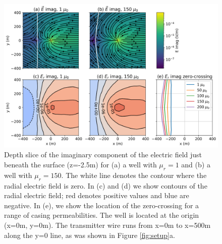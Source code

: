\begin{figure}
    \begin{center}
    \includegraphics[width=\textwidth]{figures/zero-crossing-permeability.png}
    \end{center}
\caption{
    Depth slice of the imaginary component of the electric field just beneath the surface (z=-2.5m) for (a) a well with $\mu_r=1$ and (b) a well with $\mu_r=150$. The white line denotes the contour where the radial electric field is zero. In (c) and (d) we show contours of the radial electric field; red denotes positive values and blue are negative. In (e), we show the location of the zero-crossing for a range of casing permeabilities. The well is located at the origin (x=0m, y=0m). The transmitter wire runs from x=0m to x=500m along the y=0 line, as was shown in Figure \ref{fig:setup}a.
}
\label{fig:zero-crossing-permeability}
\end{figure}



